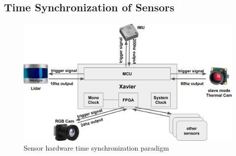 \documentclass[10pt,twocolumn,letterpaper]{article}
\begin{document}






\subsection{Time Synchronization of Sensors}

\begin{figure}[!ht]
    \centering
    \includegraphics[width=1\linewidth]{figure/sync_pic.png}
    \caption{Sensor hardware time synchronization paradigm}
    \label{fig:synchronization}
\end{figure}
\end{document}
